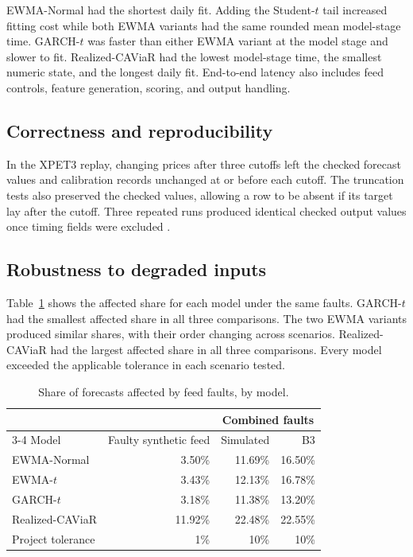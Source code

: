 \documentclass[
	12pt,				%
	openright,			%
	twoside,			%
	a4paper,
	chapter=TITLE,
	english				%
	]{abntex2}
\begin{document}
EWMA-Normal had the shortest daily fit. Adding the Student-$t$ tail increased fitting cost while both EWMA variants had the same rounded mean model-stage time. GARCH-$t$ was faster than either EWMA variant at the model stage and slower to fit. Realized-CAViaR had the lowest model-stage time, the smallest numeric state, and the longest daily fit. End-to-end latency also includes feed controls, feature generation, scoring, and output handling.

\subsection{Correctness and reproducibility}

In the XPET3 replay, changing prices after three cutoffs left the checked forecast values and calibration records unchanged at or before each cutoff. The truncation tests also preserved the checked values, allowing a row to be absent if its target lay after the cutoff. Three repeated runs produced identical checked output values once timing fields were excluded \cite{project-atam}.

\subsection{Robustness to degraded inputs}

Table~\ref{tab:faults} shows the affected share for each model under the same faults. GARCH-$t$ had the smallest affected share in all three comparisons. The two EWMA variants produced similar shares, with their order changing across scenarios. Realized-CAViaR had the largest affected share in all three comparisons. Every model exceeded the applicable tolerance in each scenario tested.

\begin{table}[htbp]
\centering
\caption{Share of forecasts affected by feed faults, by model.}
\label{tab:faults}
\small
\begin{tabular}{@{}lrrr@{}}
\toprule
 & & \multicolumn{2}{c}{Combined faults} \\
\cmidrule(lr){3-4}
Model & Faulty synthetic feed & Simulated & B3 \\
\midrule
EWMA-Normal     & 3.50\% & 11.69\% & 16.50\% \\
EWMA-$t$        & 3.43\% & 12.13\% & 16.78\% \\
GARCH-$t$       & 3.18\% & 11.38\% & 13.20\% \\
Realized-CAViaR & 11.92\% & 22.48\% & 22.55\% \\
\midrule
Project tolerance & 1\% & 10\% & 10\% \\
\bottomrule
\end{tabular}
\end{table}
\end{document}
